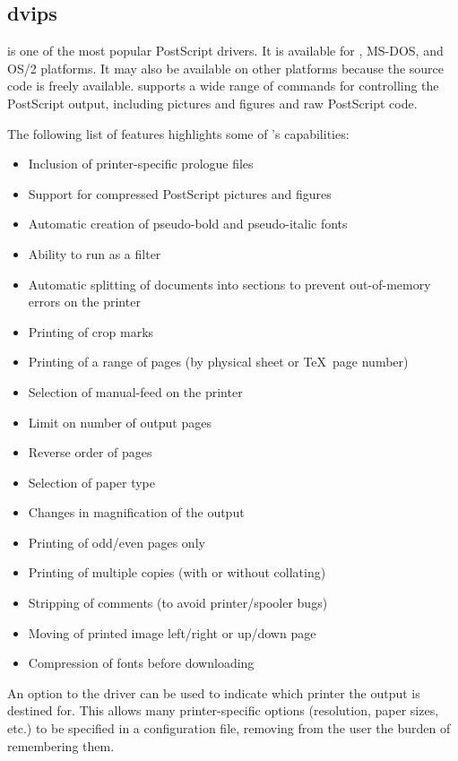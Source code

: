 \subsection{dvips}

 is one of the most popular PostScript  drivers.
It is available for \Unix, MS-DOS, and OS/2 platforms.  It may also
be available on other platforms because the source code is freely
available.
 supports a wide range of  commands for 
controlling the PostScript output, including pictures and figures and
raw PostScript code.

The following list of features highlights some of 's 
capabilities:

\begin{itemize}
  \item Inclusion of printer-specific prologue files
  \item Support for compressed PostScript pictures and figures
  \item Automatic creation of pseudo-bold and pseudo-italic fonts
  \item Ability to run as a filter
  \item Automatic splitting of documents into sections to prevent
        out-of-memory errors on the printer
  \item Printing of crop marks
  \item Printing of a range of pages (by physical sheet or \TeX\ page number)
  \item Selection of manual-feed on the printer
  \item Limit on number of output pages
  \item Reverse order of pages
  \item Selection of paper type
  \item Changes in magnification of the output
  \item Printing of odd/even pages only
  \item Printing of multiple copies (with or without collating)
  \item Stripping of comments (to avoid printer/spooler bugs)
  \item Moving of printed image left/right or up/down page
  \item Compression of fonts before downloading
\end{itemize}

An option to the  driver can be used to indicate which
printer the output is destined for.  This allows many printer-specific
options (resolution, paper sizes, etc.) to be specified in a configuration
file, removing from the user the burden of remembering them.

